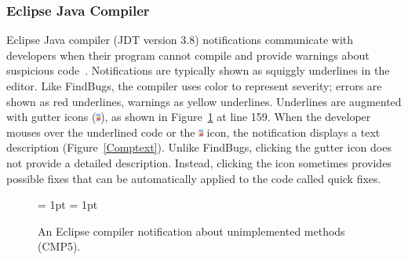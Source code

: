 \subsubsection*{Eclipse Java Compiler}

Eclipse Java compiler (JDT version 3.8) notifications communicate with developers when their program cannot
compile and provide warnings about suspicious code~\cite{EclipseCompiler}.
Notifications are typically shown as squiggly underlines in the editor. Like FindBugs, the compiler uses color to represent severity; errors
are shown as red underlines, warnings as yellow underlines.
Underlines are augmented with gutter icons
(\includegraphics[height=9px]{Chapter-4/figs/comp-x}), as shown in
Figure~\ref{fig:notificationCOMP} at line 159. When the developer mouses over
the underlined code or the \includegraphics[height=9px]{Chapter-4/figs/comp-x} icon, the
notification displays a text description (Figure~\ref{Comptext}). Unlike FindBugs, clicking the gutter icon does not provide a detailed description. Instead, clicking the icon sometimes provides possible fixes that can be automatically applied to the code called quick fixes.

\begin{figure} 
\subfigcapskip = 1pt
\centering
{}
\subfigcapskip = 1pt

\caption{An Eclipse compiler notification about unimplemented methods (CMP5).}
\label{fig:notificationCOMP} 
\end{figure}

